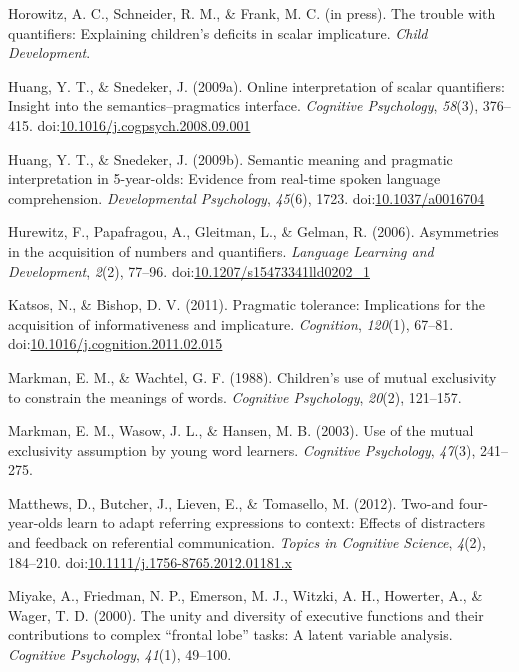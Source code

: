 \documentclass[mask,man]{apa6}
\theoremstyle{definition}
\theoremstyle{definition}
\theoremstyle{definition}
\theoremstyle{remark}
\begin{document}
\hypertarget{ref-horowitzSchneider}{}
Horowitz, A. C., Schneider, R. M., \& Frank, M. C. (in press). The
trouble with quantifiers: Explaining children's deficits in scalar
implicature. \emph{Child Development}.

\hypertarget{ref-huang2009a}{}
Huang, Y. T., \& Snedeker, J. (2009a). Online interpretation of scalar
quantifiers: Insight into the semantics--pragmatics interface.
\emph{Cognitive Psychology}, \emph{58}(3), 376--415.
doi:\href{https://doi.org/10.1016/j.cogpsych.2008.09.001}{10.1016/j.cogpsych.2008.09.001}

\hypertarget{ref-huang2009b}{}
Huang, Y. T., \& Snedeker, J. (2009b). Semantic meaning and pragmatic
interpretation in 5-year-olds: Evidence from real-time spoken language
comprehension. \emph{Developmental Psychology}, \emph{45}(6), 1723.
doi:\href{https://doi.org/10.1037/a0016704}{10.1037/a0016704}

\hypertarget{ref-hurewitz2006}{}
Hurewitz, F., Papafragou, A., Gleitman, L., \& Gelman, R. (2006).
Asymmetries in the acquisition of numbers and quantifiers.
\emph{Language Learning and Development}, \emph{2}(2), 77--96.
doi:\href{https://doi.org/10.1207/s15473341lld0202_1}{10.1207/s15473341lld0202\_1}

\hypertarget{ref-katsos2011}{}
Katsos, N., \& Bishop, D. V. (2011). Pragmatic tolerance: Implications
for the acquisition of informativeness and implicature.
\emph{Cognition}, \emph{120}(1), 67--81.
doi:\href{https://doi.org/10.1016/j.cognition.2011.02.015}{10.1016/j.cognition.2011.02.015}

\hypertarget{ref-markman1988children}{}
Markman, E. M., \& Wachtel, G. F. (1988). Children's use of mutual
exclusivity to constrain the meanings of words. \emph{Cognitive
Psychology}, \emph{20}(2), 121--157.

\hypertarget{ref-markman2003use}{}
Markman, E. M., Wasow, J. L., \& Hansen, M. B. (2003). Use of the mutual
exclusivity assumption by young word learners. \emph{Cognitive
Psychology}, \emph{47}(3), 241--275.

\hypertarget{ref-matthews2012}{}
Matthews, D., Butcher, J., Lieven, E., \& Tomasello, M. (2012). Two-and
four-year-olds learn to adapt referring expressions to context: Effects
of distracters and feedback on referential communication. \emph{Topics
in Cognitive Science}, \emph{4}(2), 184--210.
doi:\href{https://doi.org/10.1111/j.1756-8765.2012.01181.x}{10.1111/j.1756-8765.2012.01181.x}

\hypertarget{ref-miyake2000unity}{}
Miyake, A., Friedman, N. P., Emerson, M. J., Witzki, A. H., Howerter,
A., \& Wager, T. D. (2000). The unity and diversity of executive
functions and their contributions to complex ``frontal lobe'' tasks: A
latent variable analysis. \emph{Cognitive Psychology}, \emph{41}(1),
49--100.
\end{document}
